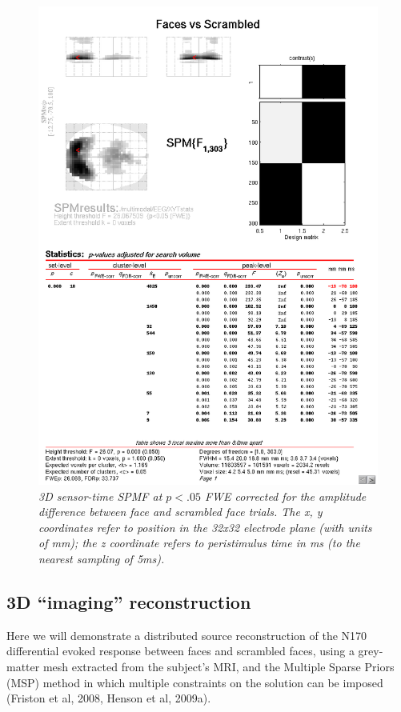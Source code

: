 \begin{figure}
\begin{center}
\includegraphics[width=120mm]{multimodal/figures/eeg_scalptime_results}
\caption{\em 3D sensor-time SPM{F} at $p<.05$ FWE corrected for the amplitude difference between face and scrambled face trials. The x, y coordinates refer to position in the 32x32 electrode plane (with units of mm); the z coordinate refers to peristimulus time in ms (to the nearest sampling of 5ms). \label{multimodal:fig:7}}
\end{center}
\end{figure}

\subsection{3D ``imaging'' reconstruction \label{multimodal:eeg:3D}}

Here we will demonstrate a distributed source reconstruction of the N170 differential evoked response between faces and scrambled faces, using a grey-matter mesh extracted from the subject's MRI, and the Multiple Sparse Priors (MSP) method in which multiple constraints on the solution can be imposed (Friston et al, 2008, Henson et al, 2009a).

